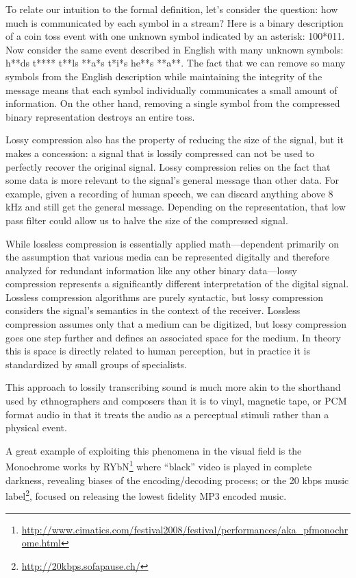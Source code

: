 \documentclass{thesis}
\begin{document}
	To relate our intuition to the formal definition, let's consider the question: how much is communicated by each symbol in a stream? Here is a binary description of a coin toss event with one unknown symbol indicated by an asterisk: 100*011. Now consider the same event described in English with many unknown symbols: h**ds t**** t**ls **a*s t*i*s he**s **a**. The fact that we can remove so many symbols from the English description while maintaining the integrity of the message means that each symbol individually communicates a small amount of information. On the other hand, removing a single symbol from the compressed binary representation destroys an entire toss.
	
	Lossy compression also has the property of reducing the size of the signal, but it makes a concession: a signal that is lossily compressed can not be used to perfectly recover the original signal. Lossy compression relies on the fact that some data is more relevant to the signal's general message than other data. For example, given a recording of human speech, we can discard anything above 8 kHz and still get the general message. Depending on the representation, that low pass filter could allow us to halve the size of the compressed signal.
	
	While lossless compression is essentially applied math---dependent primarily on the assumption that various media can be represented digitally and therefore analyzed for redundant information like any other binary data---lossy compression represents a significantly different interpretation of the digital signal. Lossless compression algorithms are purely syntactic, but lossy compression considers the signal's semantics in the context of the receiver. Lossless compression assumes only that a medium can be digitized, but lossy compression goes one step further and defines an associated space for the medium. In theory this is space is directly related to human perception, but in practice it is standardized by small groups of specialists.
	
	This approach to lossily transcribing sound is much more akin to the shorthand used by ethnographers and composers than it is to vinyl, magnetic tape, or PCM format audio in that it treats the audio as a perceptual stimuli rather than a physical event.
	
	A great example of exploiting this phenomena in the visual field is the Monochrome works by RYbN\footnote{\url{http://www.cimatics.com/festival2008/festival/performances/aka_pfmonochrome.html}} where ``black'' video is played in complete darkness, revealing biases of the encoding/decoding process; or the 20 kbps music label\footnote{\url{http://20kbps.sofapause.ch/}}, focused on releasing the lowest fidelity MP3 encoded music.
	
\end{document}
